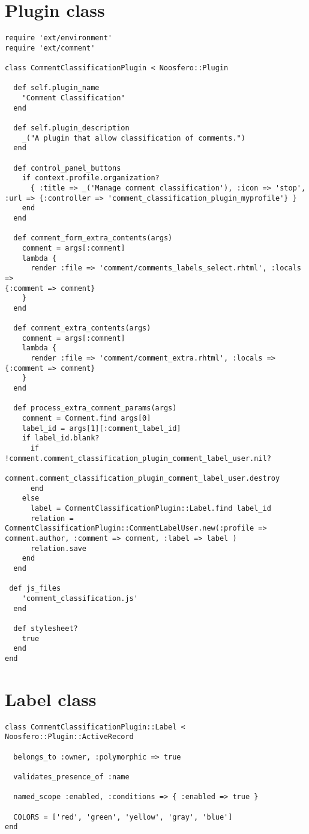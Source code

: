 \section{Plugin class} \label{App:PluginCode}

\begin{lstlisting}[style=codeFrame]
require 'ext/environment'
require 'ext/comment'

class CommentClassificationPlugin < Noosfero::Plugin

  def self.plugin_name
    "Comment Classification"
  end

  def self.plugin_description
    _("A plugin that allow classification of comments.")
  end

  def control_panel_buttons
    if context.profile.organization?
      { :title => _('Manage comment classification'), :icon => 'stop',
:url => {:controller => 'comment_classification_plugin_myprofile'} }
    end
  end

  def comment_form_extra_contents(args)
    comment = args[:comment]
    lambda {
      render :file => 'comment/comments_labels_select.rhtml', :locals =>
{:comment => comment}
    }
  end

  def comment_extra_contents(args)
    comment = args[:comment]
    lambda {
      render :file => 'comment/comment_extra.rhtml', :locals =>
{:comment => comment}
    }
  end

  def process_extra_comment_params(args)
    comment = Comment.find args[0]
    label_id = args[1][:comment_label_id]
    if label_id.blank?
      if !comment.comment_classification_plugin_comment_label_user.nil?
        comment.comment_classification_plugin_comment_label_user.destroy
      end
    else
      label = CommentClassificationPlugin::Label.find label_id
      relation =
CommentClassificationPlugin::CommentLabelUser.new(:profile =>
comment.author, :comment => comment, :label => label )
      relation.save
    end
  end

 def js_files
    'comment_classification.js'
  end

  def stylesheet?
    true
  end
end
\end{lstlisting}

\newpage
\section{Label class} \label{App:PluginLabel}

\begin{lstlisting}[style=codeFrame]
class CommentClassificationPlugin::Label <
Noosfero::Plugin::ActiveRecord

  belongs_to :owner, :polymorphic => true

  validates_presence_of :name

  named_scope :enabled, :conditions => { :enabled => true }

  COLORS = ['red', 'green', 'yellow', 'gray', 'blue']
end
\end{lstlisting}

